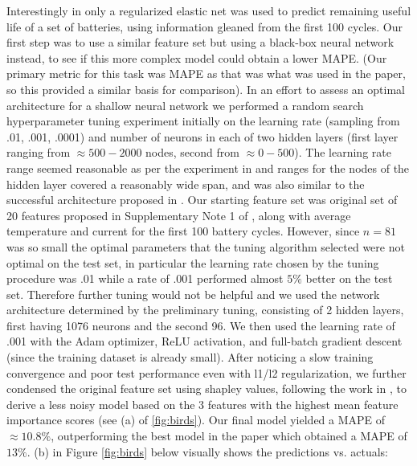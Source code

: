 \documentclass{article}
\begin{document}
Interestingly in \cite{severson2019data} only a regularized elastic net was used to predict remaining useful life of a set of batteries, using information gleaned from the first 100 cycles.  Our first step was to use a similar feature set but using a black-box neural network instead, to see if this more complex model could obtain a lower MAPE.  (Our primary metric for this task was MAPE as that was what was used in the \cite{severson2019data} paper, so this provided a similar basis for comparison).  In an effort to assess an optimal architecture for a shallow neural network we performed a random search hyperparameter tuning experiment initially on the learning rate (sampling from .01, .001, .0001) and number of neurons in each of two hidden layers (first layer ranging from $\approx 500 - 2000$ nodes, second from $\approx 0 - 500$).  The learning rate range seemed reasonable as per the experiment in \cite{kerastuner} and ranges for the nodes of the hidden layer covered a reasonably wide span, and was also similar to the successful architecture proposed in \cite{roman2021machine}.  Our starting feature set was original set of 20 features proposed in Supplementary Note 1 of \cite{severson2019data}, along with average temperature and current for the first 100 battery cycles.  \newline
However, since $n = 81$ was so small the optimal parameters that the tuning algorithm selected were not optimal on the test set, in particular the learning rate chosen by the tuning procedure was .01 while a rate of .001 performed almost $5 \%$ better on the test set. Therefore further tuning would not be helpful and we used the network architecture determined by the preliminary tuning, consisting of 2 hidden layers, first having 1076 neurons and the second 96.  We then used the learning rate of .001 with the Adam optimizer, ReLU activation, and full-batch gradient descent (since the training dataset is already small).  After noticing a slow training convergence and poor test performance even with l1/l2 regularization, we further condensed the original feature set using shapley values, following the work in \cite{shap}, to derive a less noisy model based on the 3 features with the highest mean feature importance scores (see (a) of \ref{fig:birds}). Our final model yielded a MAPE of $\approx 10.8 \%$, outperforming the best model in the paper which obtained a MAPE of $13 \%$. (b) in Figure \ref{fig:birds} below visually shows the predictions vs. actuals:
\end{document}
